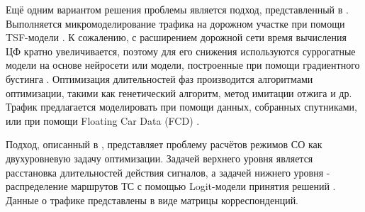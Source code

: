 Ещё одним вариантом решения проблемы является подход, представленный в  \cite{machine-learning}. Выполняется микромоделирование трафика на дорожном участке при помощи TSF-модели \cite{gora-tsf}. К сожалению, с расширением дорожной сети время вычисления ЦФ кратно увеличивается, поэтому для его снижения используются суррогатные модели на основе нейросети или модели, построенные при помощи градиентного бустинга \cite{grad-boosting}. Оптимизация длительностей фаз производится алгоритмами оптимизации, такими как генетический алгоритм, метод имитации отжига и др.
Трафик предлагается моделировать при помощи данных, собранных спутниками,  или при помощи Floating Car Data (FCD) \cite{fcd-url}.

Подход, описанный в \cite{Sun2006BilevelPF}, представляет проблему расчётов режимов СО как двухуровневую задачу оптимизации. Задачей верхнего уровня является расстановка длительностей действия сигналов, а задачей нижнего уровня - распределение маршрутов ТС с помощью Logit-модели принятия решений \cite{Logit-ref}. Данные о трафике представлены в виде матрицы корреспонденций.

